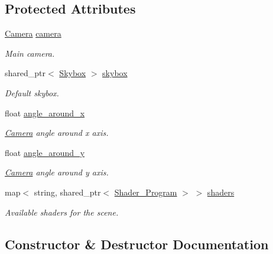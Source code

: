 \subsection*{Protected Attributes}
\begin{DoxyCompactItemize}
\item 
\mbox{\hyperlink{classoglsl_1_1_camera}{Camera}} \mbox{\hyperlink{classoglsl_1_1_scene_a272ee5697b5bb4bfb725cb07b944dec4}{camera}}
\begin{DoxyCompactList}\small\item\em Main camera. \end{DoxyCompactList}\item 
shared\+\_\+ptr$<$ \mbox{\hyperlink{classoglsl_1_1_skybox}{Skybox}} $>$ \mbox{\hyperlink{classoglsl_1_1_scene_af01c494a85900703fc19e5bb7c757ebc}{skybox}}
\begin{DoxyCompactList}\small\item\em Default skybox. \end{DoxyCompactList}\item 
float \mbox{\hyperlink{classoglsl_1_1_scene_a3acba5c9ee3e2712b142550f5f06c488}{angle\+\_\+around\+\_\+x}}
\begin{DoxyCompactList}\small\item\em \mbox{\hyperlink{classoglsl_1_1_camera}{Camera}} angle around x axis. \end{DoxyCompactList}\item 
float \mbox{\hyperlink{classoglsl_1_1_scene_af8751fb0147fb71a1f4d5a0ddf94b99e}{angle\+\_\+around\+\_\+y}}
\begin{DoxyCompactList}\small\item\em \mbox{\hyperlink{classoglsl_1_1_camera}{Camera}} angle around y axis. \end{DoxyCompactList}\item 
map$<$ string, shared\+\_\+ptr$<$ \mbox{\hyperlink{classoglsl_1_1_shader___program}{Shader\+\_\+\+Program}} $>$ $>$ \mbox{\hyperlink{classoglsl_1_1_scene_ac60cfa73f999218a5c801308d29d33eb}{shaders}}
\begin{DoxyCompactList}\small\item\em Available shaders for the scene. \end{DoxyCompactList}\end{DoxyCompactItemize}


\subsection{Constructor \& Destructor Documentation}
\mbox{\label{classoglsl_1_1_scene_a1d13c881f3b0b7d4d7bd8d5225a50481}} 
